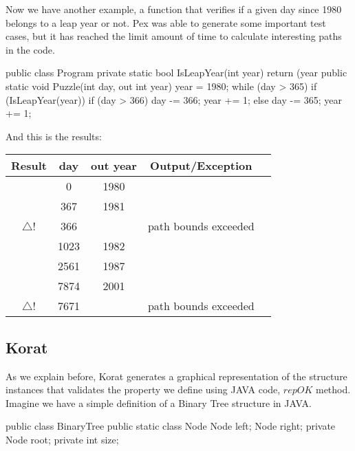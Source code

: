 \documentclass{llncs}
\newcommand{\checkK}{\color{ForestGreen}\checkmark}
\newcommand{\bigexclaim}{\color{Dandelion}$\bigtriangleup$\hspace{-5.6pt}!}
\begin{document}
Now we have another example, a function that verifies if a given day since 1980 belongs to a leap year or not. Pex was able to generate
some important test cases, but it has reached the limit amount of time to calculate interesting paths in the code.

\begin{code}
public class Program {
  private static bool IsLeapYear(int year) {
    return (year %
  }
  public static void Puzzle(int day, out int year) {
    year = 1980;
    while (day > 365) {
      if (IsLeapYear(year)) {
        if (day > 366) {
          day -= 366;
          year += 1;
        }
      } else {
        day -= 365;
        year += 1;
      }
    }
  }
}
\end{code}

And this is the results:\\

\noindent \begin{tabular}{|c|c|c|c|c|}\hline
Result & day & out year & Output/Exception\\\hline
\checkK & 0 & 1980 & \\\hline
\checkK & 367 & 1981 & \\\hline
\bigexclaim & 366 & & path bounds exceeded\\\hline
\checkK & 1023 & 1982 &\\\hline
\checkK & 2561 & 1987 & \\\hline
\checkK & 7874 & 2001 & \\\hline
\bigexclaim &  7671 & & path bounds exceeded\\\hline
\end{tabular}

\subsection{Korat}
As we explain before, Korat generates a graphical representation of the structure instances that validates the property we define using JAVA code, $repOK$ method.\\
Imagine we have a simple definition of a Binary Tree structure in JAVA.

\begin{code}
public class BinaryTree {
  public static class Node {
    Node left;
    Node right;
  }
  private Node root;
  private int size;
}
\end{code}
\end{document}
